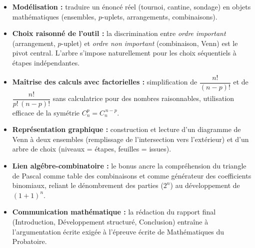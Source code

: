 \documentclass[11pt]{article}
\begin{document}
\begin{itemize}
    \item \textbf{Modélisation :} traduire un énoncé réel (tournoi, cantine, sondage) en objets mathématiques (ensembles, $p$-uplets, arrangements, combinaisons).
    \item \textbf{Choix raisonné de l'outil :} la discrimination entre \emph{ordre important} (arrangement, $p$-uplet) et \emph{ordre non important} (combinaison, Venn) est le pivot central. L'arbre s'impose naturellement pour les choix séquentiels à étapes indépendantes.
    \item \textbf{Maîtrise des calculs avec factorielles :} simplification de $\dfrac{n!}{(n-p)!}$ et de $\dfrac{n!}{p!\,(n-p)!}$ sans calculatrice pour des nombres raisonnables, utilisation efficace de la symétrie $C_n^p = C_n^{\,n-p}$.
    \item \textbf{Représentation graphique :} construction et lecture d'un diagramme de Venn à deux ensembles (remplissage de l'intersection vers l'extérieur) et d'un arbre de choix (niveaux = étapes, feuilles = issues).
    \item \textbf{Lien algébre-combinatoire :} le bonus ancre la compréhension du triangle de Pascal comme table des combinaisons et comme générateur des coefficients binomiaux, reliant le dénombrement des parties ($2^n$) au développement de $(1+1)^n$.
    \item \textbf{Communication mathématique :} la rédaction du rapport final (Introduction, Développement structuré, Conclusion) entraîne à l'argumentation écrite exigée à l'épreuve écrite de Mathématiques du Probatoire.
\end{itemize}
\end{document}
